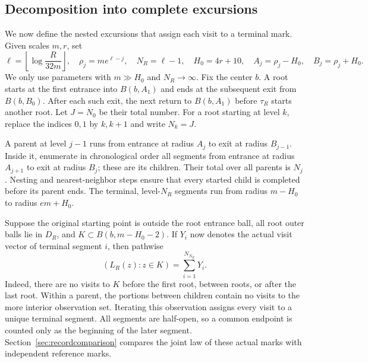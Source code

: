 \documentclass[11pt,a4paper]{article}
\numberwithin{equation}{section}
\theoremstyle{remark}
\begin{document}
\subsection{Decomposition into complete excursions}\label{sec:physical}
We now define the nested excursions that assign each visit to a terminal mark. Given scales $m,r$, set
\begin{equation}\label{eq:2.20}
\ell=\left\lfloor\log\frac R{32m}\right\rfloor,\quad
\rho_j=me^{\ell-j},\quad N_R=\ell-1,\quad
H_0=4r+10,\quad A_j=\rho_j-H_0,\quad B_j=\rho_j+H_0.
\end{equation}
We only use parameters with $m\gg H_0$ and $N_R\to\infty$. Fix the center $b$.
A root starts at the first entrance into $B(b,A_1)$ and ends at the subsequent exit from $B(b,B_0)$. After each such exit, the next return to $B(b,A_1)$ before $\tau_R$ starts another root. Let $J=N_0$ be their total number. For a root starting at level $k$, replace the indices $0,1$ by $k,k+1$ and write $N_k=J$.

A parent at level $j-1$ runs from entrance at radius $A_j$ to exit at radius $B_{j-1}$. Inside it, enumerate in chronological order all segments from entrance at radius $A_{j+1}$ to exit at radius $B_j$; these are its children. Their total over all parents is $N_j$. Nesting and nearest-neighbor steps ensure that every started child is completed before its parent ends. The terminal, level-$N_R$ segments run from radius $m-H_0$ to radius $em+H_0$.

Suppose the original starting point is outside the root entrance ball, all root outer balls lie in $D_R$, and $K\subset B(b,m-H_0-2)$. If $Y_i$ now denotes the actual visit vector of terminal segment $i$, then pathwise
\begin{equation}\label{eq:2.21}
(L_R(z):z\in K)=\sum_{i=1}^{N_{N_R}}Y_i.
\end{equation}
Indeed, there are no visits to $K$ before the first root, between roots, or after the last root. Within a parent, the portions between children contain no visits to the more interior observation set. Iterating this observation assigns every visit to a unique terminal segment. All segments are half-open, so a common endpoint is counted only as the beginning of the later segment. Section~\ref{sec:recordcomparison} compares the joint law of these actual marks with independent reference marks.
\end{document}
